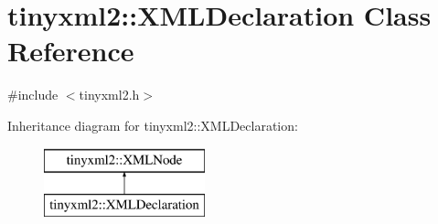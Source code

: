 \hypertarget{classtinyxml2_1_1_x_m_l_declaration}{\section{tinyxml2\-:\-:X\-M\-L\-Declaration Class Reference}
\label{classtinyxml2_1_1_x_m_l_declaration}
}


{\ttfamily \#include $<$tinyxml2.\-h$>$}

Inheritance diagram for tinyxml2\-:\-:X\-M\-L\-Declaration\-:\begin{figure}[H]
\begin{center}
\leavevmode
\includegraphics[height=2.000000cm]{classtinyxml2_1_1_x_m_l_declaration}
\end{center}
\end{figure}
